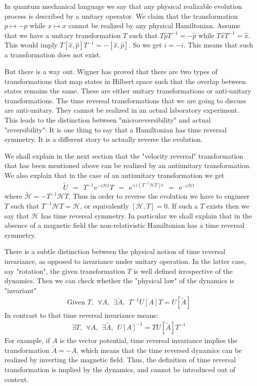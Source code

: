 \documentclass[onecolumn,fleqn, 11pt]{revtex4}
\newcommand{\eexp}{\mathrm{e}^}
\newcommand{\beq}{\begin{eqnarray}}
\newcommand{\eeq}{\end{eqnarray}}
\begin{document}
In quantum mechanical language we say that any physical 
realizable evolution process is described 
by a unitary operator.
We claim that the transformation 
$p \mapsto -p$ while $x \mapsto x$ cannot be realized 
by any physical Hamiltonian. 
Assume that we have a unitary transformation $T$ 
such that $T\hat{p}T^{-1} = -\hat{p}$ while  $T\hat{x}T^{-1}=\hat{x}$. 
This would imply $T [\hat{x},\hat{p}] T^{-1}  = - [\hat{x},\hat{p}]$. 
So we get $i=-i$. This means that such a transformation 
does not exist.  

But there is a way out. Wigner 
has proved that there are two types of transformations 
that map states in Hilbert space such that the overlap 
between states remains the same. These are 
either unitary transformations or anti-unitary transformations.
The time reversal transformations that we are going to 
discuss are anti-unitary.  
They cannot be realized in an actual laboratory experiment. 
This leads to the distinction between "microreversibility" 
and actual "reversibility": It is one thing to say 
that a Hamiltonian has time reversal symmetry. 
It is a different story to actually reverse the evolution.  

We shall explain in the next section that 
the "velocity reversal" transformation 
that has been mentioned above can be 
realized by an antiunitary transformation. 
We also explain that in the case of an 
antiunitary transformation we get
\beq
\tilde{U} \ \ = \ \ T^{-1} \eexp{-i\mathcal{H}t} T \ \ = \ \  \eexp{+i (T^{-1} \mathcal{H} T) t} \ \ = \ \ \eexp{-i\tilde{\mathcal{H}}t}
\eeq
where $\tilde{\mathcal{H}} = -T^{-1} \mathcal{H} T$. Thus in order 
to reverse the evolution we have to engineer $T$ 
such that $T^{-1} \mathcal{H} T = \mathcal{H}$, or equivalently 
$[\mathcal{H},T]=0$. If such a $T$ exists then we say that $\mathcal{H}$ 
has time reversal symmetry. In particular we shall explain 
that in the absence of a magnetic field the 
non-relativistic Hamiltonian has a time reversal symmetry.

There is a subtle distinction between the physical notion 
of time reversal invariance, as opposed to invariance under unitary operation.
In the latter case, say "rotation", the given transformation $T$ is well defined 
irrespective of the dynamics. Then we can check whether the "physical law" 
of the dynamics is "invariant"  
\beq
\mbox{Given $T$}, \ \ \forall A, \ \ \exists \tilde{A}, \ \ T^{-1}U[A]T = U[\tilde{A}] 
\eeq
In contrast to that time reversal invariance means:
\beq
\exists T, \ \ \forall A, \ \ \exists \tilde{A}, \ \  U[A]^{-1} =  T U[\tilde{A}] T^{-1}  
\eeq
For example, if $A$ is the vector potential, time reversal invariance 
implies the transformation ${\tilde{A}=-A}$, which means that 
the time reversed dynamics can be realized by inverting the magnetic field.   
Thus, the definition of time reversal transformation is implied by the dynamics, 
and cannot be introduced out of context.   
 
\end{document}
